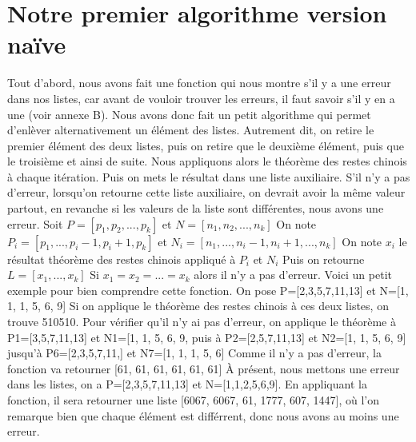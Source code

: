 \documentclass[a4paper, 11pt]{report}
\begin{document}
\section{Notre premier algorithme version naïve }
Tout d'abord, nous avons fait une fonction qui nous montre s'il y a une erreur dans nos listes, car avant de vouloir trouver les erreurs, il faut savoir s'il y en a une (voir annexe B).
Nous avons donc fait un petit algorithme qui permet d'enlèver alternativement un élément des listes. Autrement dit, on retire le premier élément des deux listes, puis on retire que le deuxième élément, puis que le troisième et ainsi de suite. Nous appliquons alors le théorème des restes chinois à chaque itération. Puis on mets le résultat dans une liste auxiliaire. S'il n'y a pas d'erreur,
lorsqu'on retourne cette liste auxiliaire, on devrait avoir la même valeur partout, en revanche si les valeurs de la liste sont différentes, nous avons une erreur. \newline
\newline
Soit $P=[p_1 , p_2, ... , p_k]$ et $N=[n_1, n_2, ..., n_k]$ \newline
On note $P_i = [p_1,..., p_i-1, p_i+1, p_k]$ et $N_i=[n_1,..., n_i-1, n_i+1, ... , n_k]$ \newline
On note $x_i$ le résultat théorème des restes chinois appliqué à $P_i$ et $N_i$ \newline
Puis on retourne 
$L=[x_1, ..., x_k]$ \newline
Si 
$x_1=x_2=...=x_k$ 
alors il n'y a pas d'erreur. \newline
\newline
Voici un petit exemple pour bien comprendre cette fonction.\newline
On pose P=[2,3,5,7,11,13] et N=[1, 1, 1, 5, 6, 9] \newline
Si on applique le théorème des restes chinois à ces deux listes, on trouve 510510. Pour vérifier qu'il n'y ai pas d'erreur, on applique le théorème à
P1=[3,5,7,11,13] et N1=[1, 1, 5, 6, 9, puis à P2=[2,5,7,11,13] et N2=[1, 1, 5, 6, 9] jusqu'à P6=[2,3,5,7,11,] et N7=[1, 1, 1, 5, 6]\newline
Comme il n'y a pas d'erreur, la fonction va retourner [61, 61, 61, 61, 61, 61] \newline
À présent, nous mettons une erreur dans les listes, on a P=[2,3,5,7,11,13] et N=[1,1,2,5,6,9]. En appliquant la fonction, il sera retourner une liste [6067, 6067, 61, 1777, 607, 1447], où l'on remarque bien que chaque élément est différrent, donc nous avons au moins une erreur.
\end{document}
